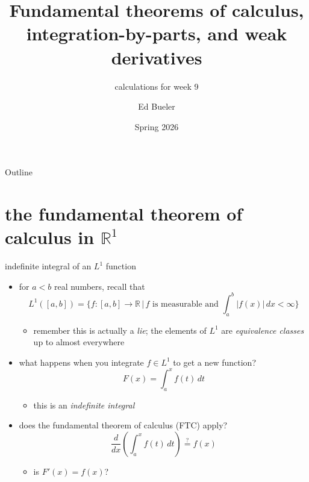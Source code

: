 \documentclass[10pt,
               svgnames,
               hyperref={colorlinks,
                         citecolor=DeepPink4,
                         linkcolor=FireBrick,
                         urlcolor=blue},
               usepdftitle=false]{beamer}
\title{Fundamental theorems of calculus, integration-by-parts, and weak derivatives}
\subtitle{calculations for week 9}
\author{Ed Bueler}
\institute[]{UAF Math 617 Functional Analysis}
\date{Spring 2026}
\newcommand{\RR}{\mathbb{R}}
\begin{document}
\beamertemplatenavigationsymbolsempty

\begin{frame}
  \maketitle
\end{frame}


\begin{frame}{Outline}
  \tableofcontents[hideallsubsections]
\end{frame}

\AtBeginSection[]
{%
}


\section{the fundamental theorem of calculus in $\RR^1$}

\begin{frame}{indefinite integral of an $L^1$ function}

\begin{itemize}
\item for $a<b$ real numbers, recall that
	$$L^1([a,b]) = \Big\{f:[a,b]\to\RR\,\big|\,f \text{ is measurable and } \int_a^b |f(x)|\,dx <\infty\Big\}$$

    \begin{itemize}
    \item[$\circ$] remember this is actually a \emph{lie}; the elements of $L^1$ are \emph{equivalence classes} up to almost everywhere
    \end{itemize}
\item what happens when you integrate $f\in L^1$ to get a new function?
	$$F(x) = \int_a^x f(t)\,dt$$

    \begin{itemize}
    \item[$\circ$] this is an \emph{indefinite integral}
    \end{itemize}
\item does the fundamental theorem of calculus (FTC) apply?
	$$\frac{d}{dx}\left(\int_a^x f(t)\,dt\right) \stackrel{?}{=} f(x)$$

    \begin{itemize}
    \item[$\circ$] is $F'(x)=f(x)$?
    \end{itemize}
\end{itemize}
\end{frame}
\end{document}
